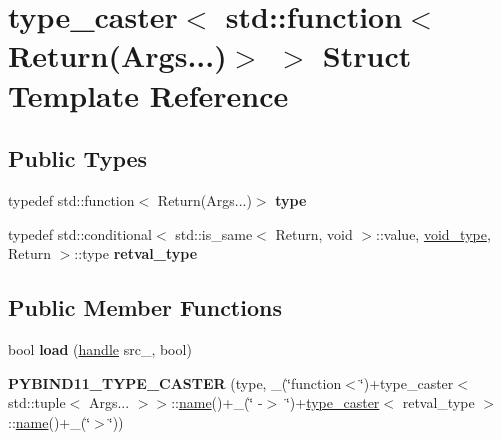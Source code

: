 \hypertarget{structtype__caster_3_01std_1_1function_3_01_return_07_args_8_8_8_08_4_01_4}{}\section{type\+\_\+caster$<$ std\+:\+:function$<$ Return(Args...)$>$ $>$ Struct Template Reference}
\label{structtype__caster_3_01std_1_1function_3_01_return_07_args_8_8_8_08_4_01_4}
\subsection*{Public Types}
\begin{DoxyCompactItemize}
\item 
typedef std\+::function$<$ Return(Args...)$>$ {\bfseries type}\hypertarget{structtype__caster_3_01std_1_1function_3_01_return_07_args_8_8_8_08_4_01_4_ac295a6ed25a5a2a379f4f686a405f0f6}{}\label{structtype__caster_3_01std_1_1function_3_01_return_07_args_8_8_8_08_4_01_4_ac295a6ed25a5a2a379f4f686a405f0f6}

\item 
typedef std\+::conditional$<$ std\+::is\+\_\+same$<$ Return, void $>$\+::value, \hyperlink{structvoid__type}{void\+\_\+type}, Return $>$\+::type {\bfseries retval\+\_\+type}\hypertarget{structtype__caster_3_01std_1_1function_3_01_return_07_args_8_8_8_08_4_01_4_a013a9fe6c5c545c2ad46d50ad9a94c42}{}\label{structtype__caster_3_01std_1_1function_3_01_return_07_args_8_8_8_08_4_01_4_a013a9fe6c5c545c2ad46d50ad9a94c42}

\end{DoxyCompactItemize}
\subsection*{Public Member Functions}
\begin{DoxyCompactItemize}
\item 
bool {\bfseries load} (\hyperlink{classhandle}{handle} src\+\_\+, bool)\hypertarget{structtype__caster_3_01std_1_1function_3_01_return_07_args_8_8_8_08_4_01_4_aff1474cd080c25b1d7880c12c9f7ca45}{}\label{structtype__caster_3_01std_1_1function_3_01_return_07_args_8_8_8_08_4_01_4_aff1474cd080c25b1d7880c12c9f7ca45}

\item 
{\bfseries P\+Y\+B\+I\+N\+D11\+\_\+\+T\+Y\+P\+E\+\_\+\+C\+A\+S\+T\+ER} (type, \+\_\+(\char`\"{}function$<$\char`\"{})+type\+\_\+caster$<$ std\+::tuple$<$ Args... $>$$>$\+::\hyperlink{structname}{name}()+\+\_\+(\char`\"{} -\/$>$ \char`\"{})+\hyperlink{classtype__caster}{type\+\_\+caster}$<$ retval\+\_\+type $>$\+::\hyperlink{structname}{name}()+\+\_\+(\char`\"{}$>$\char`\"{}))\hypertarget{structtype__caster_3_01std_1_1function_3_01_return_07_args_8_8_8_08_4_01_4_a02b70073876daf5ff87c68e96331ad1d}{}\label{structtype__caster_3_01std_1_1function_3_01_return_07_args_8_8_8_08_4_01_4_a02b70073876daf5ff87c68e96331ad1d}

\end{DoxyCompactItemize}
